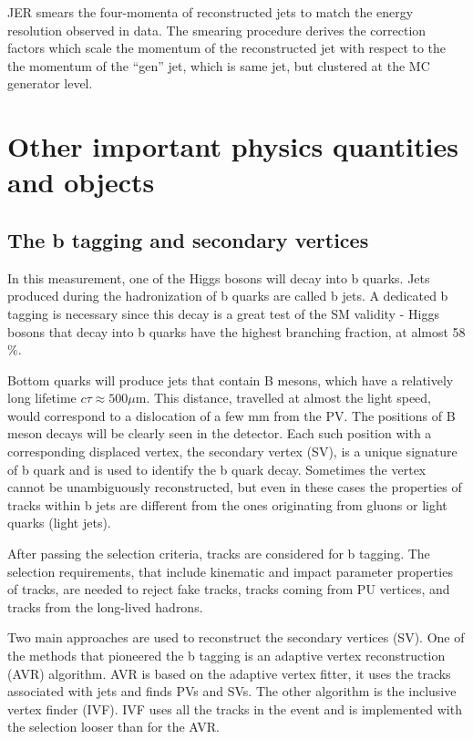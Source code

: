 JER smears the four-momenta of reconstructed jets to match the energy resolution observed in data. The smearing procedure derives the correction factors which scale the momentum of the reconstructed jet with respect to the the momentum of the ``gen'' jet, which is same jet, but clustered at the MC generator level.

\section{Other important physics quantities and objects}
\subsection{The b tagging and secondary vertices}\label{sec:btag}

In this measurement, one of the Higgs bosons will decay into b quarks. Jets produced during the hadronization of b quarks are called b jets. A dedicated b tagging is necessary since this decay is a great test of the SM validity - Higgs bosons that decay into b quarks have the highest branching fraction, at almost 58$\%$. 

Bottom quarks will produce jets that contain B mesons, which have a relatively long lifetime $c \tau \approx 500 \mu$m. This distance, travelled at almost the light speed, would correspond to a dislocation of a few mm from the PV. The positions of B meson decays will be clearly seen in the detector. Each such position with a corresponding displaced vertex, the secondary vertex (SV), is a unique signature of b quark and is used to identify the b quark decay. Sometimes the vertex cannot be unambiguously reconstructed, but even in these cases the properties of tracks within b jets are different from the ones originating from gluons or light quarks (light jets).

After passing the selection criteria, tracks are considered for b tagging. The selection requirements, that include kinematic and impact parameter properties of tracks, are needed to reject fake tracks, tracks coming from PU vertices, and tracks from the long-lived hadrons. 

Two main approaches are used to reconstruct the secondary vertices (SV). One of the methods that pioneered the b tagging is an adaptive vertex reconstruction (AVR) algorithm. AVR is based on the adaptive vertex fitter, it uses the tracks associated with jets and finds PVs and SVs. The other algorithm is the inclusive vertex finder (IVF). IVF uses all the tracks in the event and is implemented with the selection looser than for the AVR. 


